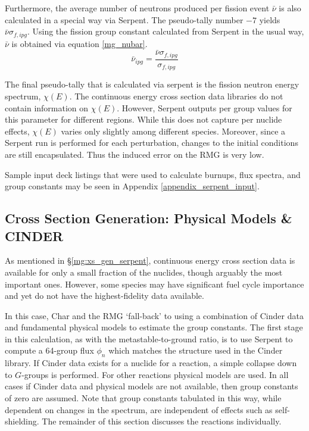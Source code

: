 Furthermore, the average number of neutrons produced per fission event $\bar{\nu}$ is also 
calculated in a special way via Serpent.  The pseudo-tally number $-7$ yields $\bar{\nu}\sigma_{f,ipg}$.
Using the fission group constant calculated from Serpent in the usual way, $\bar{\nu}$
is obtained via equation \ref{mg_nubar}.
\begin{equation}
\label{mg_nubar}
\bar{\nu}_{ipg} = \frac{\bar{\nu}\sigma_{f,ipg}}{\sigma_{f,ipg}}
\end{equation}

The final pseudo-tally that is calculated via serpent is the fission neutron energy spectrum, $\chi(E)$.
The continuous energy cross section data libraries do not contain information on $\chi(E)$.  However, 
Serpent outputs per group values for this parameter for different regions.  While this does not 
capture per nuclide effects, $\chi(E)$ varies only slightly among different species.  
Moreover, since a Serpent run is performed for each perturbation, changes to 
the initial conditions are still encapsulated.  Thus the induced error on the RMG is very low.

Sample input deck listings that were used to calculate burnups, flux spectra, and group constants
may be seen in Appendix \ref{appendix_serpent_input}.

\subsection{Cross Section Generation: Physical Models \& CINDER}
\label{mg:xs_gen_physics}
As mentioned in \S \ref{mg:xs_gen_serpent}, continuous energy cross section data is available for only 
a small fraction of the nuclides, though arguably the most important ones.  However, some species 
may have significant fuel cycle importance and yet do not have the highest-fidelity data available.

In this case, Char and the RMG `fall-back' to using a combination of Cinder data and fundamental 
physical models to estimate the group constants. The first stage in this calculation, as with the 
metastable-to-ground ratio, is to use Serpent to compute a 64-group flux $\phi_n$
which matches the structure used in the Cinder library.  If Cinder data exists for a nuclide for 
a reaction, a simple collapse down to $G$-groups is performed.  For other reactions physical
models are used.  In all cases if Cinder data and physical models are not available, then group
constants of zero are assumed.  Note that group constants tabulated in this way, while dependent 
on changes in the spectrum, are independent of effects such as self-shielding.
The remainder of this section discusses the reactions individually.

